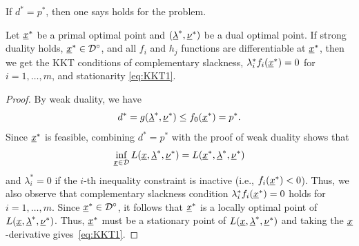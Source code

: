 \begin{definition}
If $d^* = p^*$, then one says  holds for the problem.
\end{definition}

\begin{theorem}
Let $\underline{x}^*$ be a primal optimal point and $(\underline{\lambda}^*,\underline{\nu}^*)$ be a dual optimal point.
If strong duality holds, $\underline{x}^* \in {\mathcal{D}}^{\circ}$, and all $f_i$ and $h_j$ functions are differentiable at $\underline{x}^*$, then we get the KKT conditions of complementary slackness, $\lambda_i^* f_i (\underline{x}^*) = 0$ for $i = 1,\ldots,m$, and stationarity \eqref{eq:KKT1}.
\end{theorem}
\begin{proof}
By weak duality, we have
\[ d^* = g(\underline{\lambda}^*,\underline{\nu}^*) \leq f_0 (\underline{x}^*) = p^*. \]
Since $\underline{x}^*$ is feasible, combining $d^* = p^*$ with the proof of weak duality shows that
\[ \inf_{\underline{x}\in \mathcal{D}} L(\underline{x},\underline{\lambda}^*,\underline{\nu}^*) = L(\underline{x}^*,\underline{\lambda}^*,\underline{\nu}^*) \]
and $\lambda_i^* = 0$ if the $i$-th inequality constraint is inactive (i.e., $f_i(\underline{x}^*) < 0$).
Thus, we also observe that complementary slackness condition $\lambda_i^* f_i (\underline{x}^*) = 0$ holds for $i = 1,\ldots,m$.
Since $\underline{x}^* \in {\mathcal{D}}^{\circ}$, it follows that $\underline{x}^*$ is a locally optimal point of $L(\underline{x},\underline{\lambda}^*,\underline{\nu}^*)$.
Thus, $\underline{x}^*$ must be a stationary point of $L(\underline{x},\underline{\lambda}^*,\underline{\nu}^*)$ and taking the $\underline{x}$-derivative gives~\eqref{eq:KKT1}.
\end{proof}

